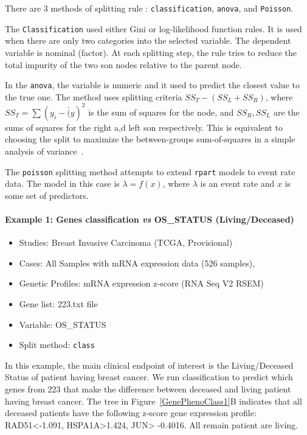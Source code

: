 \documentclass[a4paper]{article}
\begin{document}
There are 3 methods of splitting rule : \texttt{classification}, \texttt{anova}, and \texttt{Poisson}.

The \texttt{Classification} used either Gini or log-likelihood function rules. It is used when there are only two categories into the selected variable. The dependent variable is nominal (factor). At each splitting step, the rule tries to reduce the total impurity of the two son nodes relative to the parent node.

In the \texttt{anova},  the variable is numeric and it used to predict the closest value to the true one. The method uses  splitting criteria $SS_{T} -(SS_{L} + SS_{R})$, where $SS_{T} = \sum(y_{i}-\bar(y)^{2}$ is the sum of squares for the node, and $SS_{R}, SS_{L}$ are the sums of squares for the right a,d left son respectively. This is equivalent to choosing the split to maximize the between-groups sum-of-squares in a simple analysis of variance~\cite{Therneau2014}.


The \texttt{poisson} splitting method attempts to extend \texttt{rpart} models to event rate data. The model in this case is $\lambda=f(x)$, where $\lambda$ is an event rate and $x$ is some set of predictors. 


\newpage

\paragraph{Example 1: Genes classification \emph{vs} OS\_STATUS (Living/Deceased) }

\begin{itemize}
    \item Studies:  Breast Invasive Carcinoma (TCGA, Provisional)
    \item Cases: All Samples with mRNA expression data (526 samples),
    \item Genetic Profiles: mRNA expression z-score (RNA Seq V2 RSEM)
    \item Gene list: 223.txt file
    \item  Variable: OS\_STATUS
    \item Split method: \texttt{class}
 \end{itemize}

In this example, the main clinical endpoint of interest is the Living/Deceased Status of patient having breast cancer. We run classification to predict which genes from 223 that make the difference between deceased and living patient having breast cancer. The tree in Figure~\ref{GenePhenoClass1}B indicates that all deceased patients have the following z-score gene expression profile: RAD51<-1.091, HSPA1A>1.424, JUN> -0.4016. All remain patient are living.
\end{document}
